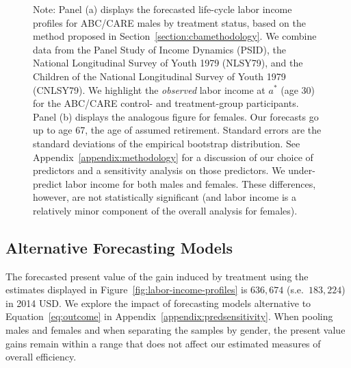 \begin{figure}
Note: Panel (a) displays the forecasted life-cycle labor income profiles for ABC/CARE males by treatment status, based on the method proposed in Section~\ref{section:cbamethodology}. We combine data from the Panel Study of Income Dynamics (PSID), the National Longitudinal Survey of Youth 1979 (NLSY79), and the Children of the National Longitudinal Survey of Youth 1979 (CNLSY79). We highlight the \textit{observed} labor income at $a^*$ (age 30) for the ABC/CARE control- and treatment-group participants. Panel (b) displays the analogous figure for females. Our forecasts go up to age 67, the age of assumed retirement. Standard errors are the standard deviations of the empirical bootstrap distribution. See  Appendix~\ref{appendix:methodology} for a discussion of our choice of predictors and a sensitivity analysis on those predictors. We under-predict labor income for both males and females. These differences, however, are not statistically significant (and labor income is a relatively minor component of the overall analysis for females).
\end{figure}

\subsection{Alternative Forecasting Models} \label{section:sens}

The forecasted present value of the gain induced by treatment using the estimates displayed in Figure~\ref{fig:labor-income-profiles} is $636,674$ (s.e.\ $183,224$) in 2014 USD. We explore the impact of forecasting models alternative to Equation~\eqref{eq:outcome} in Appendix~\ref{appendix:predsensitivity}. When pooling males and females and when separating the samples by gender, the present value gains remain within a range that does not affect our estimated measures of overall efficiency.

